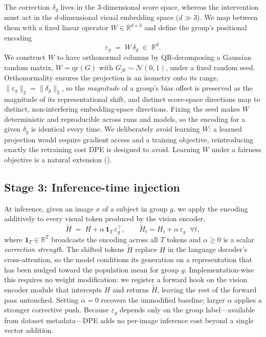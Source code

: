 The correction $\delta_g$ lives in the $3$-dimensional score space, whereas the
intervention must act in the $d$-dimensional visual embedding space
($d \gg 3$). We map between them with a fixed linear operator
$W \in \mathbb{R}^{d \times 3}$ and define the group's positional encoding
\begin{equation}
    \varepsilon_g \;=\; W\,\delta_g \;\in\; \mathbb{R}^{d}.
    \label{eq:encoding}
\end{equation}
We construct $W$ to have orthonormal columns by QR-decomposing a Gaussian random
matrix, $W = \mathrm{qr}(G)$ with $G_{jk} \sim \mathcal{N}(0,1)$, under a fixed
random seed. Orthonormality ensures the projection is an isometry onto its
range, $\lVert \varepsilon_g \rVert_2 = \lVert \delta_g \rVert_2$, so the
\emph{magnitude} of a group's bias offset is preserved as the magnitude of its
representational shift, and distinct score-space directions map to distinct,
non-interfering embedding-space directions. Fixing the seed makes $W$
deterministic and reproducible across runs and models, so the encoding for a
given $\delta_g$ is identical every time. We deliberately avoid learning $W$:
a learned projection would require gradient access and a training objective,
reintroducing exactly the retraining cost DPE is designed to avoid. Learning $W$
under a fairness objective is a natural extension ().

\subsection{Stage 3: Inference-time injection}

At inference, given an image $x$ of a subject in group $g$, we apply the
encoding additively to every visual token produced by the vision encoder,
\begin{equation}
    \tilde{H} \;=\; H + \alpha\,\mathbf{1}_T\,\varepsilon_g^{\top},
    \qquad
    \tilde{H}_t = H_t + \alpha\,\varepsilon_g \;\; \forall t,
    \label{eq:inject}
\end{equation}
where $\mathbf{1}_T \in \mathbb{R}^{T}$ broadcasts the encoding across all $T$
tokens and $\alpha \ge 0$ is a scalar \emph{correction strength}. The shifted
tokens $\tilde{H}$ replace $H$ in the language decoder's cross-attention, so the
model conditions its generation on a representation that has been nudged toward
the population mean for group $g$. Implementation-wise this requires no weight
modification: we register a forward hook on the vision encoder module that
intercepts $H$ and returns $\tilde{H}$, leaving the rest of the forward pass
untouched. Setting $\alpha = 0$ recovers the unmodified baseline; larger $\alpha$
applies a stronger corrective push. Because $\varepsilon_g$ depends only on the
group label---available from dataset metadata---DPE adds no per-image inference
cost beyond a single vector addition.

